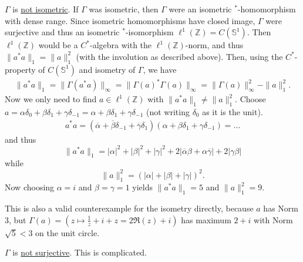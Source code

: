 \documentclass[a4paper]{article}
\newcommand{\unitcircle}{\mathds{S}^1}
\begin{document}
\begin{example}
\begin{enumerate}
		$\Gamma$ is \underline{not isometric}.
		If $\Gamma$ was isometric, then $\Gamma$ were an isometric $^*$-homomorphism with dense range.
		Since isometric homomorphisms have closed image, $\Gamma$ were surjective and thus an isometric $^*$-isomorphism $\ell^1(\mathds{Z}) = C(\unitcircle)$.
		Then $\ell^1(\mathds{Z})$ would be a $C^*$-algebra with the $\ell^1(\mathds{Z})$-norm, and thus $\|a^* a\|_1 = \|a\|_1^2$ (with the involution as described above). Then, using the $C^*$-property of $C(\unitcircle)$ and isometry of $\Gamma$, we have
		\begin{align*}
			\|a^* a\|_1 = \|\Gamma(a^* a)\|_\infty = \|\Gamma(a)^* \Gamma(a) \|_\infty = \|\Gamma(a)\|_\infty^2 - \|a\|_1^2\text{.}
		\end{align*}
		Now we only need to find $a \in \ell^1(\mathds{Z})$ with $\|a^* a \|_1 \neq \|a\|_1^2$.
		Choose $a = \alpha \delta_0 + \beta \delta_1 + \gamma \delta_{-1} = \alpha + \beta \delta_1 + \gamma \delta_{-1}$ (not writing $\delta_0$ as it is the unit).
		\begin{align*}
			a^* a = (\overline{\alpha} + \overline{\beta} \delta_{-1} + \overline{\gamma} \delta_1) (\alpha + \beta \delta_1 + \gamma \delta_{-1}) = \dots 
		\end{align*}
		and thus
		\begin{equation*}
			\|a^* a\|_1 = |\alpha|^2 + |\beta|^2 + |\gamma|^2 + 2 |\overline{\alpha} \beta + \alpha \overline{\gamma} | + 2 |\gamma \beta|
		\end{equation*}
		while
		\begin{equation*}
			\|a\|_1^2 = (|\alpha| + |\beta| + |\gamma|)^2\text{.}
		\end{equation*}
		Now choosing $\alpha = i$ and $\beta = \gamma = 1$ yields $\| a^* a\|_1 = 5$ and $\|a\|_1^2 = 9$.

		This is also a valid counterexample for the isometry directly, because $a$ has Norm $3$, but $\Gamma(a) = (z \mapsto \frac{1}{z} + i + z = 2 \Re(z) + i)$ has maximum $2 + i$ with Norm $\sqrt{5}<3$ on the unit circle.

		$\Gamma$ is \underline{not surjective}. This is complicated.
	\end{enumerate}
\end{example}
\end{document}
